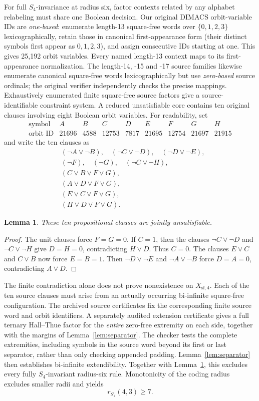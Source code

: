 \documentclass[11pt]{article}
\newtheorem{lemma}[theorem]{Lemma}
\theoremstyle{remark}
\newcommand{\SigmaFour}{\{0,1,2,3\}}
\newcommand{\Xsf}{X_{\mathrm{sf},4}}
\newcommand{\Sym}{S_4}
\begin{document}
For full $\Sym$-invariance at radius six, factor contexts related
by any alphabet relabeling must share one Boolean decision.
Our original DIMACS orbit-variable IDs are \emph{one-based}:
enumerate length-13 square-free words over $\SigmaFour$
lexicographically, retain those in canonical
first-appearance form (their distinct symbols first appear
as $0,1,2,3$), and assign consecutive IDs starting at one.
This gives 25,192 orbit variables. Every named length-13
context maps to its first-appearance normalization.
The length-14, -15 and -17 source families likewise enumerate
canonical square-free words lexicographically but use
\emph{zero-based} source ordinals; the original verifier
independently checks the precise mappings.
Exhaustively enumerated finite square-free source factors give a
source-identifiable constraint system. A reduced unsatisfiable core
contains ten original clauses involving eight Boolean orbit
variables. For readability, set
\[
\begin{array}{c|cccccccc}
\text{symbol}&A&B&C&D&E&F&G&H\\\hline
\text{orbit ID}&21696&4588&12753&7817&21695&12754&21697&21915
\end{array}
\]
and write the ten clauses as
\begin{align*}
&(\neg A\vee\neg B),\quad
 (\neg C\vee\neg D),\quad
 (\neg D\vee\neg E),\\
&(\neg F),\quad(\neg G),\quad(\neg C\vee\neg H),\\
&(C\vee B\vee F\vee G),\\
&(A\vee D\vee F\vee G),\\
&(E\vee C\vee F\vee G),\\
&(H\vee D\vee F\vee G).
\end{align*}

\begin{lemma}\label{lem:tenclauses}
These ten propositional clauses are jointly unsatisfiable.
\end{lemma}
\begin{proof}
The unit clauses force $F=G=0$. If $C=1$, then the clauses
$\neg C\vee\neg D$ and $\neg C\vee\neg H$ give $D=H=0$,
contradicting $H\vee D$. Thus $C=0$.
The clauses $E\vee C$ and $C\vee B$ now force $E=B=1$.
Then $\neg D\vee\neg E$ and $\neg A\vee\neg B$ force
$D=A=0$, contradicting $A\vee D$.
\end{proof}

The finite contradiction alone does not prove nonexistence on
$\Xsf$. Each of the ten source clauses must arise from an
actually occurring bi-infinite square-free configuration.
The archived source certificates fix the corresponding finite
source word and orbit identifiers. A separately audited extension
certificate gives a full ternary Hall--Thue factor for the
\emph{entire} zero-free extremity on each side, together with the
margins of Lemma~\ref{lem:separator}. The checker tests the complete
extremities, including symbols in the source word beyond its first
or last separator, rather than only checking appended padding.
Lemma~\ref{lem:separator} then establishes bi-infinite
extendibility. Together with Lemma~\ref{lem:tenclauses}, this
excludes every fully $\Sym$-invariant radius-six rule.
Monotonicity of the coding radius excludes smaller radii and yields
\[
 r_{\Sym}(4,3)\ge 7.
\]
\end{document}
